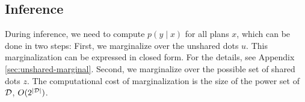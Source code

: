 \documentclass[11pt]{article}
\newcommand{\daniel}[1]{{{\textcolor{red}{(Daniel: #1)}}}}
\newcommand{\srush}[1]{{{\textcolor{green}{(Sasha: #1)}}}}
\begin{document}




\subsection{Inference}
\label{sec:inference}


During inference, we need to compute $p(y \mid x)$ for all plans $x$,
which can be done in two steps: First, we marginalize over the unshared dots $u$.
This marginalization can be expressed in closed form.
For the details, see Appendix \ref{sec:unshared-marginal}.
Second, we marginalize over the possible set of shared dots $z$.
The computational cost of marginalization is the size of the power set of $\mathcal{D}$, $O(2^{|\mathcal{D}|})$.
\end{document}
